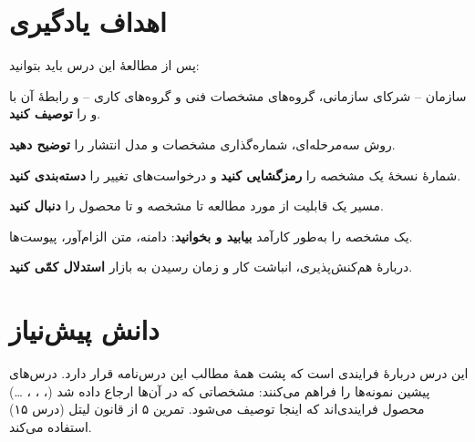 \documentclass[11pt,a4paper]{article}
\begin{document}
\ACNcover

\section{اهداف یادگیری}
پس از مطالعهٔ این درس باید بتوانید:
\begin{objectives}
  \item سازمان  -- شرکای سازمانی، گروه‌های مشخصات فنی و گروه‌های کاری -- و رابطهٔ آن با  و  را
        \textbf{توصیف کنید}.
  \item روش سه‌مرحله‌ای، شماره‌گذاری مشخصات و مدل انتشار را \textbf{توضیح دهید}.
  \item شمارهٔ نسخهٔ یک مشخصه را \textbf{رمزگشایی کنید} و درخواست‌های تغییر را \textbf{دسته‌بندی کنید}.
  \item مسیر یک قابلیت از مورد مطالعه تا مشخصه و تا محصول را \textbf{دنبال کنید}.
  \item یک مشخصه را به‌طور کارآمد \textbf{بیابید و بخوانید}: دامنه، متن الزام‌آور، پیوست‌ها.
  \item دربارهٔ هم‌کنش‌پذیری، انباشت کار و زمان رسیدن به بازار \textbf{استدلال کمّی کنید}.
\end{objectives}

\section{دانش پیش‌نیاز}
این درس دربارهٔ فرایندی است که پشت همهٔ مطالب این درس‌نامه قرار دارد. درس‌های پیشین نمونه‌ها را فراهم می‌کنند: مشخصاتی که
در آن‌ها ارجاع داده شد (، ، ، \ldots) محصول فرایندی‌اند که اینجا توصیف می‌شود.
تمرین ۵ از قانون لیتل (درس ۱۵) استفاده می‌کند.
\end{document}
